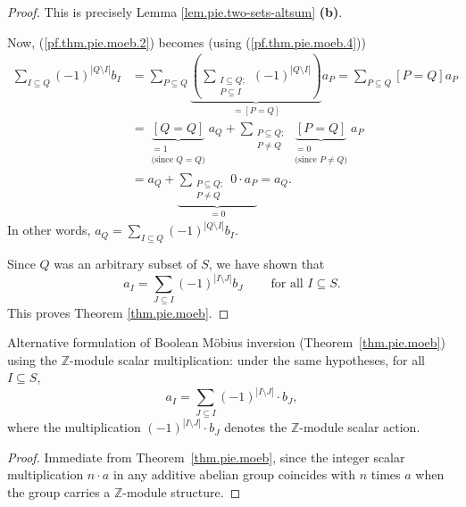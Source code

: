 \begin{proof}
This is precisely Lemma \ref{lem.pie.two-sets-altsum} \textbf{(b)}.

Now, (\ref{pf.thm.pie.moeb.2}) becomes
(using (\ref{pf.thm.pie.moeb.4}))
\begin{align*}
\sum_{I\subseteq Q}\left(  -1\right)  ^{\left\vert Q\setminus I\right\vert
}b_{I}  &  =\sum_{P\subseteq Q}\underbrace{\left(  \sum_{\substack{I\subseteq
Q;\\P\subseteq I}}\left(  -1\right)  ^{\left\vert Q\setminus I\right\vert
}\right)  }_{=\left[  P=Q\right]  }a_{P}=\sum_{P\subseteq Q}\left[  P=Q\right]
a_{P}\\
&  =\underbrace{\left[  Q=Q\right]  }_{\substack{=1\\\text{(since }%
Q=Q\text{)}}}a_{Q}+\sum_{\substack{P\subseteq Q;\\P\neq Q}}\underbrace{\left[
P=Q\right]  }_{\substack{=0\\\text{(since }P\neq Q\text{)}}}a_{P}\\
&  =a_{Q}+\underbrace{\sum_{\substack{P\subseteq Q;\\P\neq Q}}0 \cdot a_{P}}%
_{=0}=a_{Q}.
\end{align*}
In other words, $a_{Q}=\sum_{I\subseteq Q}\left(  -1\right)  ^{\left\vert
Q\setminus I\right\vert }b_{I}$.

Since $Q$ was an arbitrary subset of $S$, we have shown that
\[
a_{I}=\sum_{J\subseteq I}\left(  -1\right)  ^{\left\vert I\setminus
J\right\vert }b_{J}\ \ \ \ \ \ \ \ \ \ \text{for all }I\subseteq S.
\]
This proves Theorem \ref{thm.pie.moeb}.
\end{proof}

\begin{lemma}
\label{lem.pie.moeb-module}
\leanhelper
\leanok
Alternative formulation of Boolean M\"{o}bius inversion
(Theorem~\ref{thm.pie.moeb}) using the $\mathbb{Z}$-module scalar
multiplication: under the same hypotheses, for all $I\subseteq S$,
\[
a_{I}=\sum_{J\subseteq I}\left(-1\right)^{\left\vert I\setminus
J\right\vert}\cdot b_{J},
\]
where the multiplication $(-1)^{|I\setminus J|}\cdot b_J$ denotes the
$\mathbb{Z}$-module scalar action.
\end{lemma}

\begin{proof}
\leanok
Immediate from Theorem~\ref{thm.pie.moeb}, since the integer scalar
multiplication $n\cdot a$ in any additive abelian group coincides with
$n$ times $a$ when the group carries a $\mathbb{Z}$-module structure.
\end{proof}
